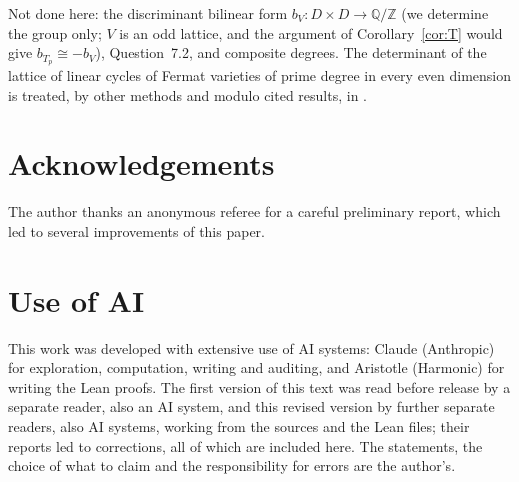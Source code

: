 \documentclass[11pt]{article}
\theoremstyle{definition}
\theoremstyle{remark}
\newcommand{\Z}{\mathbb{Z}}
\newcommand{\Q}{\mathbb{Q}}
\begin{document}
Not done here: the discriminant bilinear form $b_V\colon D\times D\to\Q/\Z$ (we determine the group only; $V$ is an odd lattice, and the argument of Corollary~\ref{cor:T} would give $b_{T_p}\cong-b_V$), Question~7.2, and composite degrees. The determinant of the lattice of linear cycles of Fermat varieties of prime degree in every even dimension is treated, by other methods and modulo cited results, in \cite{WMEven}.

\section*{Acknowledgements}

The author thanks an anonymous referee for a careful preliminary report, which led to several improvements of this paper.

\section*{Use of AI}

This work was developed with extensive use of AI systems: Claude (Anthropic) for exploration, computation, writing and auditing, and Aristotle (Harmonic) for writing the Lean proofs. The first version of this text was read before release by a separate reader, also an AI system, and this revised version by further separate readers, also AI systems, working from the sources and the Lean files; their reports led to corrections, all of which are included here. The statements, the choice of what to claim and the responsibility for errors are the author's.
\end{document}
